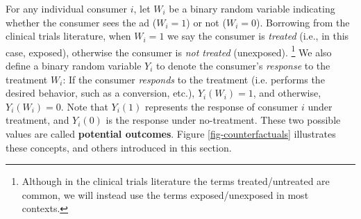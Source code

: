 \documentclass[11pt,a4paper]{article}
\theoremstyle{definition}
\theoremstyle{remark}
\theoremstyle{definition}
\theoremstyle{definition}
\theoremstyle{definition}
\theoremstyle{definition}
\theoremstyle{definition}
\theoremstyle{definition}
\begin{document}
For any individual consumer $i$, let $W_i$ be a binary random variable indicating whether the consumer sees the ad ($W_i = 1$) or not ($W_i = 0$). Borrowing from the clinical trials literature, when $W_i=1$ we say the consumer is {\em treated} (i.e., in this case, exposed), otherwise the consumer is {\em not treated} (unexposed).
\footnote{Although in the clinical trials literature the terms treated/untreated are common, we will instead use the terms exposed/unexposed in most contexts.} 
We also define a binary random variable $Y_i$ to denote the consumer's {\em response} to the treatment $W_i$: If the consumer {\em responds} to the treatment (i.e. performs the desired behavior, such as a conversion, etc.), $Y_i(W_i)=1$, and otherwise, $Y_i(W_i)=0$. Note that $Y_i(1)$ represents the response of consumer $i$ under treatment, and $Y_i(0)$ is the response under no-treatment. These two possible values are called {\bf potential outcomes}. Figure \ref{fig-counterfactuals} 
illustrates these concepts, and others introduced in this section.
\end{document}
